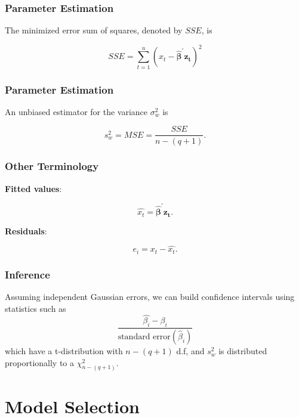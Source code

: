 \documentclass[%
xcolor=pdftex]{beamer}
\begin{document}
\begin{frame}
\frametitle{Parameter Estimation}

The minimized error sum of squares, denoted by $SSE$, is

\begin{equation}
SSE = \sum_{t=1}^{n}  ( x_t - \boldsymbol{\hat{\beta}^{\prime}z_t})^2
\end{equation}

\end{frame}

\begin{frame}
\frametitle{Parameter Estimation}

An unbiased estimator for the variance $\sigma_w^2$ is

\begin{equation}
s_w^2 = MSE = \frac{SSE}{n-(q+1)}.
\end{equation}

\end{frame}

\begin{frame}
\frametitle{Other Terminology}

\textbf{Fitted values}:

\begin{equation}
\hat{x_t} = \hat{\boldsymbol{\beta}}^{\prime}\boldsymbol{z_t}.
\end{equation}

\textbf{Residuals}:

\begin{equation}
e_i = x_t - \hat{x_t}.
\end{equation}

\end{frame}

\begin{frame}
\frametitle{Inference}

Assuming independent Gaussian errors, we can build confidence intervals using statistics such as
$$
\frac{\hat{\beta_i} -\beta_i}{\mbox{standard error}(\hat\beta_i)}
$$
which have a t-distribution with $n-(q+1)$ d.f, and $s_w^2$ is distributed proportionally to a $\chi^2_{n-(q+1)}$.

\end{frame}

\section{Model Selection}
\frame{\tableofcontents[currentsection]}
\end{document}

